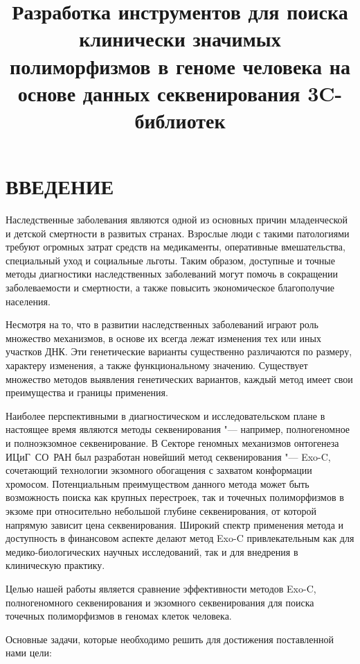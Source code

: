 \documentclass[12pt, twoside, a4paper]{article}
\title{Разработка инструментов для поиска клинически значимых полиморфизмов в геноме человека на основе данных секвенирования 3C-библиотек}
\begin{document}

\maketitle

\section*{ВВЕДЕНИЕ}

Наследственные заболевания являются одной из основных причин младенческой и детской смертности в развитых странах\cite{Field_2003}.
Взрослые люди с такими патологиями требуют огромных затрат средств на медикаменты, оперативные вмешательства, специальный уход и социальные льготы.
Таким образом, доступные и точные методы диагностики наследственных заболеваний могут помочь в сокращении заболеваемости и смертности, а также повысить экономическое благополучие населения.

Несмотря на то, что в развитии наследственных заболеваний играют роль множество механизмов, в основе их всегда лежат изменения тех или иных участков ДНК.
Эти генетические варианты существенно различаются по размеру, характеру изменения, а также функциональному значению.
Существует множество методов выявления генетических вариантов, каждый метод имеет свои преимущества и границы применения.

Наиболее перспективными в диагностическом и исследовательском плане в настоящее время являются методы секвенирования "--- например, полногеномное и полноэкзомное секвенирование.
В Секторе геномных механизмов онтогенеза ИЦиГ~СО~РАН был разработан новейший метод секвенирования "--- Exo-C, сочетающий технологии экзомного обогащения с захватом конформации хромосом.
Потенциальным преимуществом данного метода может быть возможность поиска как крупных перестроек, так и точечных полиморфизмов в экзоме при относительно небольшой глубине секвенирования, от которой напрямую зависит цена секвенирования.
Широкий спектр применения метода и доступность в финансовом аспекте делают метод Exo-C привлекательным как для медико-биологических научных исследований, так и для внедрения в клиническую практику.

Целью нашей работы является сравнение эффективности методов Exo-C, полногеномного секвенирования и экзомного секвенирования для поиска точечных полиморфизмов в геномах клеток человека.

Основные задачи, которые необходимо решить для достижения поставленной нами цели:
\end{document}
